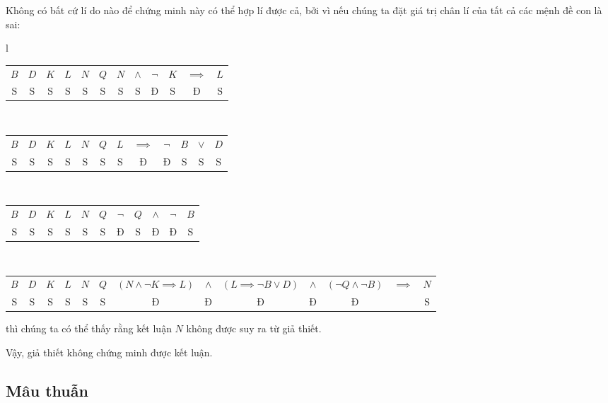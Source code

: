 Không có bất cứ lí do nào để chứng minh này có thể hợp lí được cả, bởi vì nếu chúng ta đặt giá trị chân lí của tất cả các mệnh đề con là sai:
\begin{center}
    \begin{tabular}{l}
        \begin{tabular}{|c|c|c|c|c|c|cccccc|}
            \hline
            $B$ & $D$ & $K$ & $L$ & $N$ & $Q$ & $N$ & $\land$ & $\neg$ & $K$ & $\implies$ & $L$ \\
            \headerDivider
            S & S & S & S & S & S & S & S & Đ & S & Đ & S \\
            \hline
        \end{tabular} \\
        \begin{tabular}{|c|c|c|c|c|c|cccccc|}
            \hline
            $B$ & $D$ & $K$ & $L$ & $N$ & $Q$ & $L$ & $\implies$ & $\neg$ & $B$ & $\lor$ & $D$ \\
            \headerDivider
            S & S & S & S & S & S & S & Đ & Đ & S & S & S \\
            \hline
        \end{tabular} \\
        \begin{tabular}{|c|c|c|c|c|c|ccccc|}
            \hline
            $B$ & $D$ & $K$ & $L$ & $N$ & $Q$ & $\neg$ & $Q$ & $\land$ & $\neg$ & $B$ \\
            \headerDivider
            S & S & S & S & S & S & Đ & S & Đ & Đ & S \\
            \hline
        \end{tabular} \\
        \begin{tabular}{|c|c|c|c|c|c|ccccccc|}
            \hline
            $B$ & $D$ & $K$ & $L$ & $N$ & $Q$ & $(N \land \neg K \implies L)$ & $\land$ & $(L \implies \neg B \lor D)$ & $\land$ & $(\neg Q \land \neg B)$ & $\implies$ & $N$ \\
            \headerDivider
            S & S & S & S & S & S & Đ & Đ & Đ & Đ & Đ & \emphcolor{S} & S \\
            \hline
        \end{tabular}
    \end{tabular}
\end{center}
thì chúng ta có thể thấy rằng kết luận $N$ không được suy ra từ giả thiết.

Vậy, giả thiết không chứng minh được kết luận.

\subsection{Mâu thuẫn}

